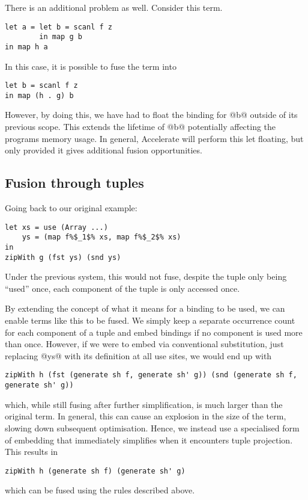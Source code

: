 There is an additional problem as well. Consider this term.
%
\begin{lstlisting}
let a = let b = scanl f z
        in map g b
in map h a
\end{lstlisting}
%
In this case, it is possible to fuse the term into
%
\begin{lstlisting}
let b = scanl f z
in map (h . g) b
\end{lstlisting}
%
However, by doing this, we have had to float the binding for @b@ outside of its previous scope. This extends the lifetime of @b@ potentially affecting the programs memory usage. In general, Accelerate will perform this let floating, but only provided it gives additional fusion opportunities.

\subsection{Fusion through tuples}

Going back to our original example:
%
\begin{lstlisting}
let xs = use (Array ...)
    ys = (map f%$_1$% xs, map f%$_2$% xs)
in
zipWith g (fst ys) (snd ys)
\end{lstlisting}
%
Under the previous system, this would not fuse, despite the tuple only being ``used'' once, each component of the tuple is only accessed once.

By extending the concept of what it means for a binding to be used, we can enable terms like this to be fused. We simply keep a separate occurrence count for each component of a tuple and embed bindings if no component is used more than once. However, if we were to embed via conventional substitution, just replacing @ys@ with its definition at all use sites, we would end up with
%
\begin{lstlisting}
zipWith h (fst (generate sh f, generate sh' g)) (snd (generate sh f, generate sh' g))
\end{lstlisting}
%
which, while still fusing after further simplification, is much larger than the original term. In general, this can cause an explosion in the size of the term, slowing down subsequent optimisation. Hence, we instead use a specialised form of embedding that immediately simplifies when it encounters tuple projection. This results in
%
\begin{lstlisting}
zipWith h (generate sh f) (generate sh' g)
\end{lstlisting}
%
which can be fused using the rules described above.

